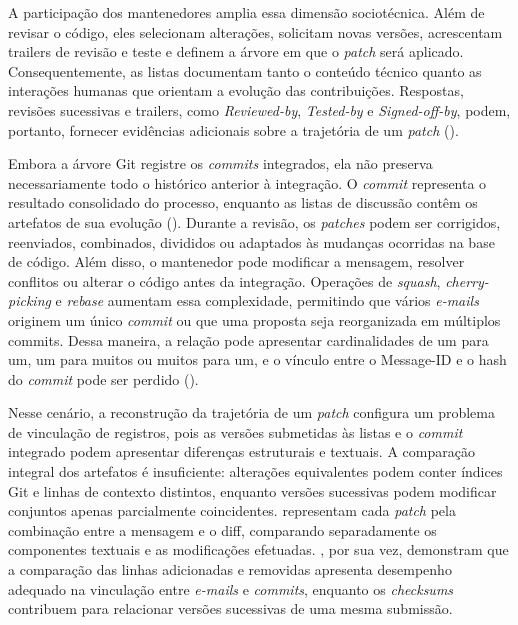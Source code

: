 A participação dos mantenedores amplia essa dimensão sociotécnica. Além de revisar o código, eles selecionam alterações, solicitam novas versões, acrescentam trailers de revisão e teste e definem a árvore em que o \textit{patch} será aplicado. Consequentemente, as listas documentam tanto o conteúdo técnico quanto as interações humanas que orientam a evolução das contribuições. Respostas, revisões sucessivas e trailers, como \textit{Reviewed-by}, \textit{Tested-by} e \textit{Signed-off-by}, podem, portanto, fornecer evidências adicionais sobre a trajetória de um \textit{patch} (\cite{ferreira2019maintainers}).

Embora a árvore Git registre os \textit{commits} integrados, ela não preserva necessariamente todo o histórico anterior à integração. O \textit{commit} representa o resultado consolidado do processo, enquanto as listas de discussão contêm os artefatos de sua evolução (\cite{ramsauer2019list}). Durante a revisão, os \textit{patches} podem ser corrigidos, reenviados, combinados, divididos ou adaptados às mudanças ocorridas na base de código. Além disso, o mantenedor pode modificar a mensagem, resolver conflitos ou alterar o código antes da integração. Operações de \textit{squash}, \textit{cherry-picking} e \textit{rebase} aumentam essa complexidade, permitindo que vários \textit{e-mails} originem um único \textit{commit} ou que uma proposta seja reorganizada em múltiplos commits. Dessa maneira, a relação pode apresentar cardinalidades de um para um, um para muitos ou muitos para um, e o vínculo entre o Message-ID e o hash do \textit{commit} pode ser perdido (\cite{ramsauer2019list}).

Nesse cenário, a reconstrução da trajetória de um \textit{patch} configura um problema de vinculação de registros, pois as versões submetidas às listas e o \textit{commit} integrado podem apresentar diferenças estruturais e textuais. A comparação integral dos artefatos é insuficiente: alterações equivalentes podem conter índices Git e linhas de contexto distintos, enquanto versões sucessivas podem modificar conjuntos apenas parcialmente coincidentes. \cite{ramsauer2019list} representam cada \textit{patch} pela combinação entre a mensagem e o diff, comparando separadamente os componentes textuais e as modificações efetuadas. \cite{jiang2014tracing}, por sua vez, demonstram que a comparação das linhas adicionadas e removidas apresenta desempenho adequado na vinculação entre \textit{e-mails} e \textit{commits}, enquanto os \textit{checksums} contribuem para relacionar versões sucessivas de uma mesma submissão.

